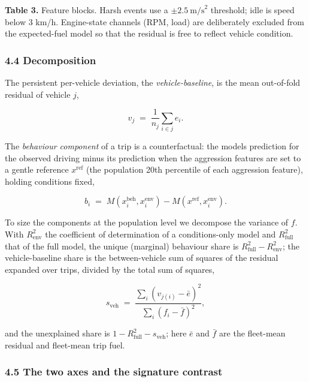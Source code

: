\textbf{Table 3.} Feature blocks. Harsh events use a
\(\pm 2.5\ \text{m/s}^2\) threshold; idle is speed below 3 km/h.
Engine-state channels (RPM, load) are deliberately excluded from the
expected-fuel model so that the residual is free to reflect vehicle
condition.

\subsubsection{4.4 Decomposition}\label{decomposition}

The persistent per-vehicle deviation, the \emph{vehicle-baseline}, is
the mean out-of-fold residual of vehicle \(j\),

\begin{equation} v_j \;=\; \frac{1}{n_j}\sum_{i \in j} e_i . \end{equation}

The \emph{behaviour component} of a trip is a counterfactual: the
model\textquotesingle s prediction for the observed driving minus its
prediction when the aggression features are set to a gentle reference
\(x^{\text{ref}}\) (the population 20th percentile of each aggression
feature), holding conditions fixed,

\begin{equation} b_i \;=\; M\!\left(x^{\text{beh}}_i, x^{\text{env}}_i\right) - M\!\left(x^{\text{ref}}, x^{\text{env}}_i\right). \end{equation}

To size the components at the population level we decompose the variance
of \(f\). With \(R^2_{\text{env}}\) the coefficient of determination of
a conditions-only model and \(R^2_{\text{full}}\) that of the full
model, the unique (marginal) behaviour share is
\(R^2_{\text{full}}-R^2_{\text{env}}\); the vehicle-baseline share is
the between-vehicle sum of squares of the residual expanded over trips,
divided by the total sum of squares,

\begin{equation} s_{\text{veh}} \;=\; \frac{\sum_i (v_{j(i)}-\bar e)^2}{\sum_i (f_i-\bar f)^2}, \end{equation}

and the unexplained share is \(1-R^2_{\text{full}}-s_{\text{veh}}\);
here \(\bar e\) and \(\bar f\) are the fleet-mean residual and
fleet-mean trip fuel.

\subsubsection{4.5 The two axes and the signature
contrast}\label{the-two-axes-and-the-signature-contrast}

